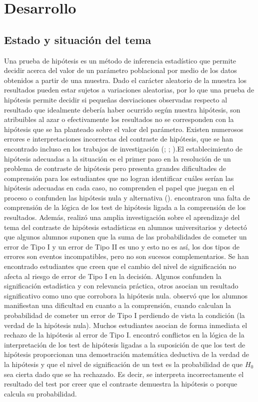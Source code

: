 \documentclass[oneside,spanish]{amsart}
\numberwithin{equation}{section}
\theoremstyle{definition}
\begin{document}
\section{Desarrollo}

\subsection{Estado y situación del tema}

Una prueba de hipótesis es un método de inferencia estadístico que permite decidir acerca del valor de un parámetro poblacional por medio de los datos obtenidos a partir de una muestra. Dado el carácter aleatorio de la muestra los resultados pueden estar sujetos a variaciones aleatorias, por lo que una prueba de hipótesis permite decidir si pequeñas desviaciones observadas respecto al resultado que idealmente debería haber ocurrido según nuestra hipótesis, son atribuibles al azar o efectivamente los resultados no se corresponden con la hipótesis que se ha planteado sobre el valor del parámetro. Existen numerosos errores e interpretaciones incorrectas del contraste de hipótesis, que se han encontrado incluso en los trabajos de investigación (\citet{batanero00}; \citet{falk95}; \citet{harradine11}).El establecimiento de hipótesis adecuadas a la situación es el primer paso en la resolución de un problema de contraste de hipótesis pero presenta grandes dificultades de comprensión para los estudiantes que no logran identificar cuáles serían las hipótesis adecuadas en cada caso, no comprenden el papel que juegan en el proceso o confunden las hipótesis nula y alternativa (\citet{vallecillos97}). \citet{liu09} encontraron una falta de comprensión de la lógica de los test de hipótesis ligada a la comprensión de los resultados. Además, \citet{vallecillos94} realizó una amplia investigación sobre el aprendizaje del tema del contraste de hipótesis estadísticas en alumnos universitarios y detectó que algunos alumnos suponen que la suma de las probabilidades de cometer un error de Tipo I y un error de Tipo II es uno y esto no es así, los dos tipos de errores son eventos incompatibles, pero no son sucesos complementarios.  Se han encontrado estudiantes que creen que el cambio del nivel de significación no afecta al riesgo de error de Tipo I en la decisión. Algunos confunden la significación estadística y con relevancia práctica, otros asocian un resultado significativo como uno que corrobora la hipótesis nula. \citet{batanero17} observó que los alumnos manifiestan una dificultad en cuanto a la comprensión, cuando calculan la probabilidad de cometer un error de Tipo I perdiendo de vista la condición (la verdad de la hipótesis nula). Muchos estudiantes asocian de forma inmediata el rechazo de la hipótesis al error de Tipo I. \citet{vallecillos97} encontró conflictos en la lógica de la interpretación de los test de hipótesis ligadas a la suposición de que los test de hipótesis proporcionan una demostración matemática deductiva de la verdad de la hipótesis y que el nivel de significación de un test es la probabilidad de que $H_0$ sea cierta dado que se ha rechazado. Es decir, se interpreta incorrectamente el resultado del test por creer que el contraste demuestra la hipótesis o porque calcula su probabilidad. 
\end{document}
